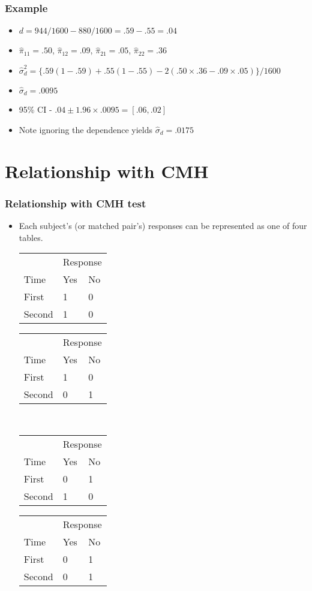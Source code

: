 \documentclass[aspectratio=169]{beamer}
\begin{document}
\begin{frame}\frametitle{Example}
\begin{itemize}
\item $d = 944 / 1600 - 880 / 1600 = .59 - .55 = .04$ 
\item $\hat \pi_{11} = .50$, $\hat \pi_{12} =.09$, $\hat \pi_{21} = .05$, $\hat \pi_{22} = .36$ 
\item $\hat \sigma^2_d = \{.59(1-.59)+.55(1-.55) - 2(.50\times .36 - .09\times .05)\} / 1600$ 
\item $\hat \sigma_d = .0095$
\item 95\% CI - $.04 \pm 1.96 \times .0095 = [.06, .02]$ 
\item Note ignoring the dependence yields $\hat \sigma_d = .0175$
\end{itemize}
\end{frame}

\section{Relationship with CMH}
\begin{frame}\frametitle{Relationship with CMH test}
\begin{itemize}
\item Each subject's (or matched pair's) responses can be represented as one
of four tables.
  \begin{center}
\ttfamily
    \begin{tabular}{lll}
   & \multicolumn{2}{c}{Response} \\
Time   & Yes      & No  \\
  First      & 1        & 0         \\
  Second   & 1        & 0         \\
    \end{tabular}
    \begin{tabular}{lll}
   & \multicolumn{2}{c}{Response} \\
Time   & Yes      & No  \\
  First      & 1        & 0         \\
  Second   & 0        & 1         \\
    \end{tabular} \\
    \begin{tabular}{lll}
   & \multicolumn{2}{c}{Response} \\
Time   & Yes      & No  \\
  First      & 0        & 1         \\
  Second   & 1        & 0         \\
    \end{tabular}
    \begin{tabular}{lll}
   & \multicolumn{2}{c}{Response} \\
Time   & Yes      & No  \\
  First      & 0        & 1         \\
  Second   & 0        & 1         \\
    \end{tabular}
 \end{center}
\end{itemize}
\end{frame}
\end{document}
